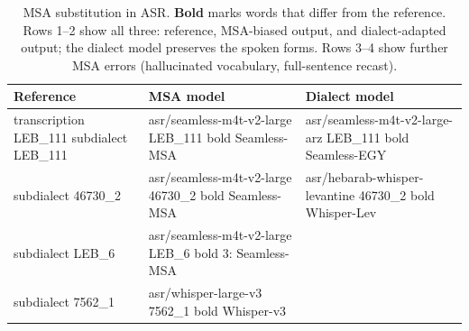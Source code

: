 \begin{table}[t]
\centering
\small
\begin{tabular}{p{2.4cm} p{2.4cm} p{2.0cm}}
\toprule
\textbf{Reference} & \textbf{MSA model} & \textbf{Dialect model} \\
\midrule
{{transcription LEB_111}}
  \newline \scriptsize {{subdialect LEB_111}}
  & {{asr/seamless-m4t-v2-large LEB_111 bold}}
    \newline \scriptsize Seamless-MSA
  & {{asr/seamless-m4t-v2-large-arz LEB_111 bold}}
    \newline \scriptsize Seamless-EGY \\
\addlinespace[6pt]
{{transcription 46730_2}}
  \newline \scriptsize {{subdialect 46730_2}}
  & {{asr/seamless-m4t-v2-large 46730_2 bold}}
    \newline \scriptsize Seamless-MSA
  & {{asr/hebarab-whisper-levantine 46730_2 bold}}
    \newline \scriptsize Whisper-Lev \\
\addlinespace[6pt]
{{transcription LEB_6 4:}}
  \newline \scriptsize {{subdialect LEB_6}}
  & {{asr/seamless-m4t-v2-large LEB_6 bold 3:}}
    \newline \scriptsize Seamless-MSA
  & \\
\addlinespace[6pt]
{{transcription 7562_1}}
  \newline \scriptsize {{subdialect 7562_1}}
  & {{asr/whisper-large-v3 7562_1 bold}}
    \newline \scriptsize Whisper-v3
  & \\
\bottomrule
\end{tabular}
\caption{MSA substitution in ASR. \textbf{Bold} marks words that differ from the reference. Rows 1--2 show all three: reference, MSA-biased output, and dialect-adapted output; the dialect model preserves the spoken forms. Rows 3--4 show further MSA errors (hallucinated vocabulary, full-sentence recast).}
\label{tab:asr-qualitative}
\end{table}
